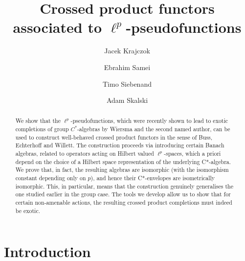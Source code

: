 \documentclass[12pt]{amsart}
\title[$PF_p$-crossed product functors]{Crossed product functors associated
to $\ell^p$-pseudofunctions}
\author[Krajczok]{Jacek Krajczok}
\author[Samei]{Ebrahim Samei}
\author[Siebenand]{Timo Siebenand}
\author[Skalski]{Adam Skalski}
\theoremstyle{definition}
\theoremstyle{remark}
\numberwithin{equation}{section}
\begin{document}
\begin{abstract}
We show that the $\ell^p$-pseudofunctions, which were recently shown to lead to exotic completions of group $C^*$-algebras  by Wiersma and the second named author, can be used to construct well-behaved crossed product functors in the sense of Buss, Echterhoff and Willett. The construction proceeds via introducing certain  Banach algebras, related to operators acting on Hilbert valued $\ell^p$-spaces, which a priori depend on the choice of a Hilbert space representation of the underlying C*-algebra. We prove that, in fact, the resulting algebras are isomorphic (with the isomorphism constant depending only on $p$), and hence their C*-envelopes are isometrically isomorphic. This, in particular, means that the construction genuinely generalises the one studied earlier in the group case. The tools we develop allow us to show that for certain non-amenable actions, the resulting crossed product completions must indeed be exotic.
\end{abstract}




\maketitle


\section{Introduction}
\end{document}
